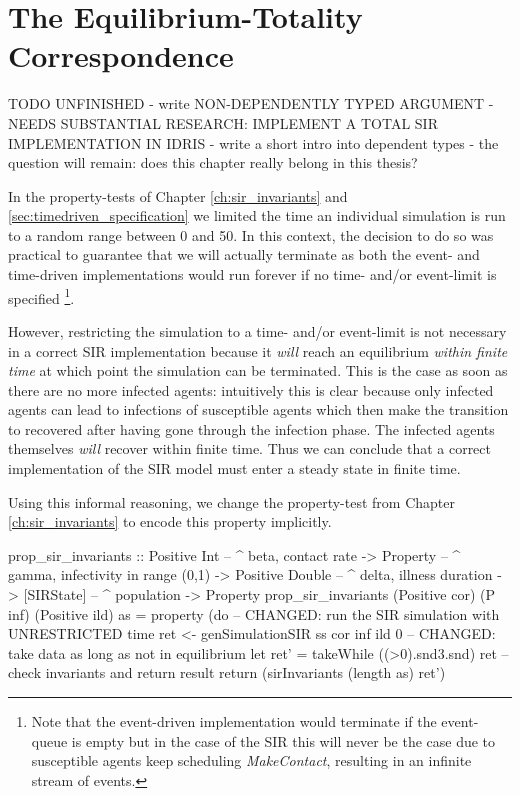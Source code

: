 \chapter{The Equilibrium-Totality Correspondence}
\label{ch:equilibrium_totality}

TODO UNFINISHED
- write NON-DEPENDENTLY TYPED ARGUMENT
- NEEDS SUBSTANTIAL RESEARCH: IMPLEMENT A TOTAL SIR IMPLEMENTATION IN IDRIS
- write a short intro into dependent types
- the question will remain: does this chapter really belong in this thesis?

In the property-tests of Chapter \ref{ch:sir_invariants} and \ref{sec:timedriven_specification} we limited the time an individual simulation is run to a random range between 0 and 50. In this context, the decision to do so was practical to guarantee that we will actually terminate as both the event- and time-driven implementations would run forever if no time- and/or event-limit is specified \footnote{Note that the event-driven implementation would terminate if the event-queue is empty but in the case of the SIR this will never be the case due to susceptible agents keep scheduling \textit{MakeContact}, resulting in an infinite stream of events.}.

However, restricting the simulation to a time- and/or event-limit is not necessary in a correct SIR implementation because it  \textit{will} reach an equilibrium \textit{within finite time} at which point the simulation can be terminated. This is the case as soon as there are no more infected agents: intuitively this is clear because only infected agents can lead to infections of susceptible agents which then make the transition to recovered after having gone through the infection phase. The infected agents themselves \textit{will} recover within finite time. Thus we can conclude that a correct implementation of the SIR model must enter a steady state in finite time.

Using this informal reasoning, we change the property-test from Chapter \ref{ch:sir_invariants} to encode this property implicitly.

\begin{HaskellCode}
prop_sir_invariants :: Positive Int    -- ^ beta, contact rate
                    -> Property        -- ^ gamma, infectivity in range (0,1)
                    -> Positive Double -- ^ delta, illness duration
                    -> [SIRState]      -- ^ population
                    -> Property
prop_sir_invariants 
    (Positive cor) (P inf) (Positive ild) as  = property (do
  -- CHANGED: run the SIR simulation with UNRESTRICTED time
  ret <- genSimulationSIR ss cor inf ild 0
  -- CHANGED: take data as long as not in equilibrium
  let ret' = takeWhile ((>0).snd3.snd) ret
  -- check invariants and return result
  return (sirInvariants (length as) ret')
\end{HaskellCode}

